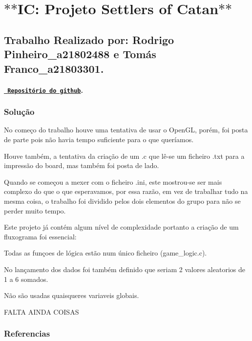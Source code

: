 \section*{$\ast$$\ast$\+IC\+: Projeto Settlers of Catan$\ast$$\ast$}

\subsection*{Trabalho Realizado por\+: Rodrigo Pinheiro\+\_\+a21802488 e Tomás Franco\+\_\+a21803301.}

\paragraph*{\href{https://github.com/ThomasFranque/IC_SettlersOfJapun}{\texttt{ Repositório do github}}.}

\subsubsection*{Solução}


\begin{DoxyItemize}
\item No começo do trabalho houve uma tentativa de usar o Open\+GL, porém, foi posta de parte pois não havia tempo suficiente para o que queríamos.
\item Houve também, a tentativa da criação de um .c que lê-\/se um ficheiro .txt para a impressão do board, mas também foi posta de lado.
\item Quando se começou a mexer com o ficheiro .ini, este mostrou-\/se ser mais complexo do que o que esperavamos, por essa razão, em vez de trabalhar tudo na mesma coisa, o trabalho foi dividido pelos dois elementos do grupo para não se perder muito tempo.
\item Este projeto já contém algum nível de complexidade portanto a criação de um fluxograma foi essencial\+: 
\item Todas as funçoes de lógica estão num único ficheiro (game\+\_\+logic.\+c).
\item No lançamento dos dados foi também definido que seriam 2 valores aleatorios de 1 a 6 somados.
\item Não são usadas quaisqueres variaveis globais.
\item F\+A\+L\+TA A\+I\+N\+DA C\+O\+I\+S\+AS \subsubsection*{Referencias}
\end{DoxyItemize}

